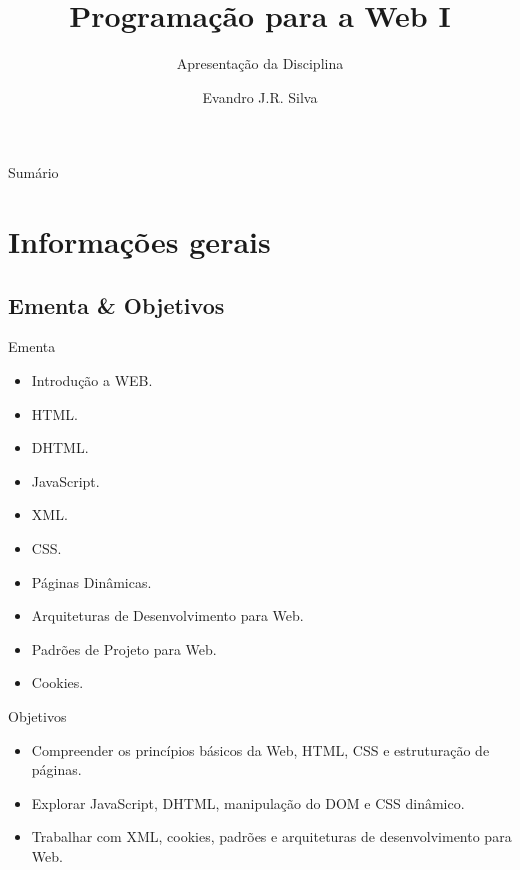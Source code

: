 \documentclass{beamer}
\title[AP 00]{Programação para a Web I}
\subtitle{Apresentação da Disciplina}
\author[E.J.R. Silva]{Evandro J.R. Silva}
\date{}
\begin{document}
\begin{frame}
    \titlepage
\end{frame}

\begin{frame}{Sumário}
    \tableofcontents
\end{frame}

\section{Informações gerais}

\subsection{Ementa \& Objetivos}

\begin{frame}{Ementa}
    \begin{itemize}
        \justifying
        \item Introdução a WEB.
        \item HTML.
        \item DHTML.
        \item JavaScript.
        \item XML.
        \item CSS.
        \item Páginas Dinâmicas.
        \item Arquiteturas de Desenvolvimento para Web.
        \item Padrões de Projeto para Web.
        \item Cookies.
    \end{itemize}
\end{frame}

\begin{frame}{Objetivos}
    \begin{itemize}
        \justifying
        \item Compreender os princípios básicos da Web, HTML, CSS e estruturação de páginas.
        \item Explorar JavaScript, DHTML, manipulação do DOM e CSS dinâmico.
        \item Trabalhar com XML, cookies, padrões e arquiteturas de desenvolvimento para Web.
    \end{itemize}
\end{frame}
\end{document}
